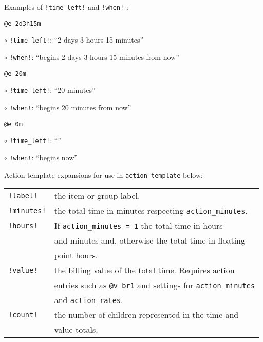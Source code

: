 \documentclass[10pt,landscape]{article}
\begin{document}
\begin{multicols}{3}
Examples of \verb'!time_left!' and \verb'!when!' :
\begin{compactitem}
\item \verb!@e 2d3h15m!
    \begin{compactitem}
        \item[$\circ$] \verb'!time_left!': ``2 days 3 hours 15 minutes''
        \item[$\circ$] \verb'!when!': ``begins 2 days 3 hours 15 minutes from now''
    \end{compactitem}
\item \verb!@e 20m!
    \begin{compactitem}
        \item[$\circ$] \verb'!time_left!': ``20 minutes''
        \item[$\circ$] \verb'!when!': ``begins 20 minutes from now''
    \end{compactitem}
\item \verb!@e 0m!
    \begin{compactitem}
        \item[$\circ$] \verb'!time_left!': ``''
        \item[$\circ$] \verb'!when!': ``begins now''
    \end{compactitem}
\end{compactitem}

Action template expansions for use in \verb!action_template! below:

\begin{tabular}{@{}ll@{}}
\verb'!label!' & the item or group label. \\
\verb'!minutes!' &  the total time in minutes respecting \verb!action_minutes!. \\
\verb'!hours!' & If \verb!action_minutes = 1! the total time in hours \\
               & and minutes and, otherwise the total time in floating \\
               & point hours. \\
\verb'!value!' & the billing value of the total time. Requires action \\
               & entries such as \verb!@v br1! and settings  for \verb!action_minutes! \\
               & and \verb!action_rates!. \\
\verb'!count!' & the number of children represented in the time and \\
               & value totals. \\
\end{tabular}


\end{multicols}
\end{document}
